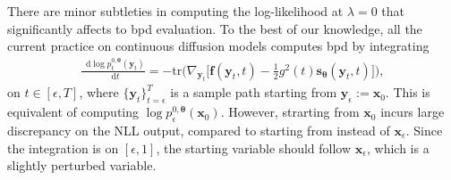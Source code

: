 \documentclass{article}
\theoremstyle{definition}
\theoremstyle{remark}
\newcommand*\diff{\mathop{}\!\mathrm{d}}
\begin{document}
	There are minor subtleties in computing the log-likelihood at $\lambda=0$ that significantly affects to bpd evaluation. To the best of our knowledge, all the current practice on continuous diffusion models computes bpd by integrating
	\begin{align*}
	\frac{\diff \log{p_{t}^{0,\bm{\theta}}(\mathbf{y}_{t})}}{\diff t}=-\text{tr}\bigg(\nabla_{\mathbf{y}_{t}}\Big[\mathbf{f}(\mathbf{y}_{t},t)-\frac{1}{2}g^{2}(t)\mathbf{s}_{\bm{\theta}}(\mathbf{y}_{t},t)\Big]\bigg),
	\end{align*}
	on $t\in[\epsilon,T]$, where $\{\mathbf{y}_{t}\}_{t=\epsilon}^{T}$ is a sample path starting from $\mathbf{y}_{\epsilon}:=\mathbf{x}_{0}$. This is equivalent of computing $\log{p_{\epsilon}^{0,\bm{\theta}}(\mathbf{x}_{0})}$. However, strarting from $\mathbf{x}_{0}$ incurs large discrepancy on the NLL output, compared to starting from instead of $\mathbf{x}_{\epsilon}$. Since the integration is on $[\epsilon,1]$, the starting variable should follow $\mathbf{x}_{\epsilon}$, which is a slightly perturbed variable.
	
\end{document}
